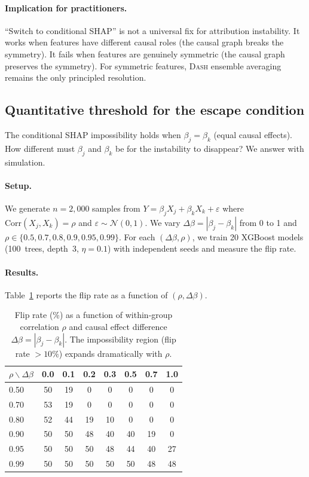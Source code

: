 \documentclass{article}
\newcommand{\DASH}{\textsc{Dash}}
\begin{document}
\paragraph{Implication for practitioners.}
``Switch to conditional SHAP'' is not a universal fix for
attribution instability. It works when features have different
causal roles (the causal graph breaks the symmetry). It fails when
features are genuinely symmetric (the causal graph preserves the
symmetry). For symmetric features, \DASH{} ensemble averaging
remains the only principled resolution.

\subsection{Quantitative threshold for the escape condition}

The conditional SHAP impossibility holds when $\beta_j = \beta_k$
(equal causal effects). How different must $\beta_j$ and $\beta_k$ be
for the instability to disappear? We answer with simulation.

\paragraph{Setup.}
We generate $n{=}2{,}000$ samples from
$Y = \beta_j X_j + \beta_k X_k + \varepsilon$ where
$\text{Corr}(X_j, X_k) = \rho$ and $\varepsilon \sim \mathcal{N}(0,1)$.
We vary $\Delta\beta = |\beta_j - \beta_k|$ from 0 to 1 and
$\rho \in \{0.5, 0.7, 0.8, 0.9, 0.95, 0.99\}$.
For each $(\Delta\beta, \rho)$, we train 20 XGBoost models
(100~trees, depth~3, $\eta{=}0.1$) with independent seeds
and measure the flip rate.

\paragraph{Results.}
Table~\ref{tab:conditional-threshold} reports the flip rate
as a function of $(\rho, \Delta\beta)$.

\begin{table}[htbp]
\centering
\caption{Flip rate (\%) as a function of within-group correlation
$\rho$ and causal effect difference $\Delta\beta = |\beta_j - \beta_k|$.
The impossibility region (flip rate $> 10\%$) expands dramatically
with $\rho$.}
\label{tab:conditional-threshold}
\small
\begin{tabular}{@{}lccccccc@{}}
\toprule
$\rho \backslash \Delta\beta$ & 0.0 & 0.1 & 0.2 & 0.3 & 0.5 & 0.7 & 1.0 \\
\midrule
0.50 & 50 & 19 & 0 & 0 & 0 & 0 & 0 \\
0.70 & 53 & 19 & 0 & 0 & 0 & 0 & 0 \\
0.80 & 52 & 44 & 19 & 10 & 0 & 0 & 0 \\
0.90 & 50 & 50 & 48 & 40 & 40 & 19 & 0 \\
0.95 & 50 & 50 & 50 & 48 & 44 & 40 & 27 \\
0.99 & 50 & 50 & 50 & 50 & 50 & 48 & 48 \\
\bottomrule
\end{tabular}
\end{table}
\end{document}
